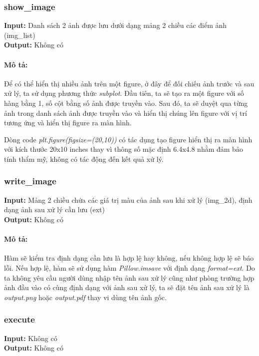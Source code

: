 \documentclass{article}
\begin{document}
\subsubsection{show\_image}
\textbf{Input:} Danh sách 2 ảnh được lưu dưới dạng mảng 2 chiều các điểm ảnh (img\_list) \\
\textbf{Output:} Không có

\paragraph*{Mô tả:}
Để có thể hiển thị nhiều ảnh trên một figure, ở đây để đối chiếu ảnh trước và sau xử lý, ta sử dụng phương thức \textit{subplot}. Đầu tiên, ta sẽ tạo ra một figure với số hàng bằng 1, số cột bằng số ảnh được truyền vào. Sau đó, ta sẽ duyệt qua từng ảnh trong danh sách ảnh được truyền vào và hiển thị chúng lên figure với vị trí tương ứng và hiển thị figure ra màn hình.

Dòng code \textit{plt.figure(figsize=(20,10))} có tác dụng tạo figure hiển thị ra màn hình với kích thước 20x10 inches thay vì thông số mặc định 6.4x4.8 nhằm đảm bảo tính thẩm mỹ, không có tác động đến kết quả xử lý.

\subsubsection{write\_image}
\textbf{Input:} Mảng 2 chiều chứa các giá trị màu của ảnh sau khi xử lý (img\_2d), định dạng ảnh sau xử lý cần lưu (ext)\\
\textbf{Output:} Không có

\paragraph*{Mô tả:}
Hàm sẽ kiểm tra định dạng cần lưu là hợp lệ hay không, nếu không hợp lệ sẽ báo lỗi. Nếu hợp lệ, hàm sẽ sử dụng hàm \textit{Pillow.imsave} với định dạng \textit{format=ext}. Do ta không yêu cầu người dùng nhập tên ảnh sau xử lý cũng như phòng trường hợp ảnh đầu vào có cùng định dạng với ảnh sau xử lý, ta sẽ đặt tên ảnh sau xử lý là \textit{output.png} hoặc \textit{output.pdf} thay vi dùng tên ảnh gốc.

\subsubsection{execute}
\textbf{Input:} Không có \\
\textbf{Output:} Không có
\end{document}
